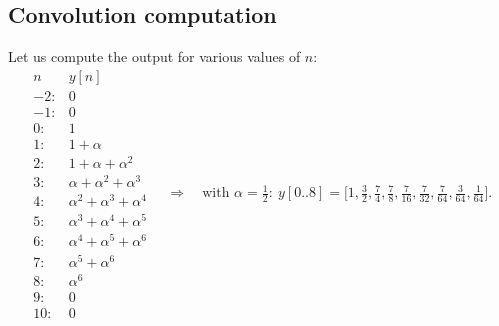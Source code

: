 \documentclass{ee102_notes}
\begin{document}
\medskip
{}

\medskip
{}

\medskip
\subsection{Convolution computation}

Let us compute the output for various values of $n$:
\[
\begin{array}{c|l}
n & y[n] \\ \hline
-2: & 0\\
-1: & 0\\
0: & 1\\
1: & 1+\alpha\\
2: & 1+\alpha+\alpha^2\\
3: & \alpha+\alpha^2+\alpha^3\\
4: & \alpha^2+\alpha^3+\alpha^4\\
5: & \alpha^3+\alpha^4+\alpha^5\\
6: & \alpha^4+\alpha^5+\alpha^6\\
7: & \alpha^5+\alpha^6\\
8: & \alpha^6\\
9: & 0\\
10: & 0
\end{array}
\quad\Rightarrow\quad
\text{with }\alpha=\tfrac12:\ 
y[0..8]=\Big[1,\tfrac32,\tfrac74,\tfrac78,\tfrac7{16},\tfrac7{32},\tfrac7{64},\tfrac3{64},\tfrac1{64}\Big].
\]
\newpage
\def\Alpha{0.5}   %
\def\HLen{6}      %
\def\Xmin{-2} \def\Xmax{5}    %
\def\Kmin{-6} \def\Kmax{10}   %
\def\xscale{0.65cm} \def\yscale{1.5cm}
\def\panelgap{0.9cm}

\newcommand{\EmptyAxes}[4]{%
\begin{tikzpicture}[x=\xscale,y=\yscale]
  \draw[->] (#1-0.6,0) -- (#2+0.6,0) node[below] {#4};
  \draw[->] (0,-0.05) -- (0,1.05) node[left] {#3};
  \foreach \t in {#1,...,#2} \node[below=3pt] at (\t,0) {\scriptsize \t};
\end{tikzpicture}%
}

\newcommand{\BlankConvPanel}[1]{%
\noindent\textbf{Graphically solve for $n=#1$}\\
\EmptyAxes{\Xmin}{\Xmax}{$x[k]$}{$k$}\hspace{\panelgap}%
\EmptyAxes{\Kmin}{\Kmax}{$h[n-k]$}{$k$}\hspace{\panelgap}%
\EmptyAxes{\Kmin}{\Kmax}{$y[n]$}{$n$}\\[8pt]
}
\end{document}

